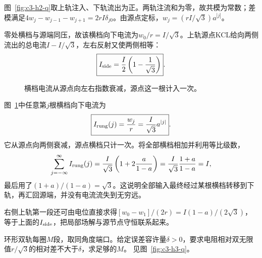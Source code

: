 \begin{solution}
图~\ref{fig:c3-h2-q}取上轨注入、下轨流出为正。两轨注流和为零，故共模为常数；差模满足$4w_j-w_{j-1}-w_{j+1}=2rI\delta_{j0}$。由源点定标，$w_j=(rI/\sqrt3)a^{|j|}$。

零处横档与源端同压，故该横档向下电流为$w_0/r=I/\sqrt3$。上轨源点KCL给向两侧流出的总电流$I-I/\sqrt3$，左右反射又使两侧相等：
\[
 \boxed{I_{\rm side}=\frac I2\left(1-\frac1{\sqrt3}\right)}.
\]
\begin{figure}[H]\centering
{}
\caption{横档电流从源点向左右指数衰减，源点这一根计入一次。}\label{fig:c3-h2-s}
\end{figure}
图~\ref{fig:c3-h2-s}中任意第$j$根横档向下电流为
\[
 \boxed{I_{\rm rung}(j)=\frac{w_j}r=\frac I{\sqrt3}a^{|j|}}.
\]
它从源点向两侧衰减，源点横档只计一次。将全部横档相加并利用等比级数，
\[
 \sum_{j=-\infty}^{\infty}I_{\rm rung}(j)
 =\frac I{\sqrt3}\left(1+2\frac a{1-a}\right)
 =\frac I{\sqrt3}\frac{1+a}{1-a}=I,
\]
最后用了$(1+a)/(1-a)=\sqrt3$。这说明全部输入最终经过某根横档转移到下轨，再汇回源端，并没有电流流失到无穷远。

右侧上轨第一段还可由电位直接求得$[w_0-w_1]/(2r)=I(1-a)/(2\sqrt3)$，等于上面的$I_{\rm side}$，把局部场解与源节点守恒联系起来。
\end{solution}

\begin{exercise}[把环形网络逐渐展开]\label{ex:c3-h3}
环形双轨每圈$M$段，取同角度端口。给定误差容许量$\delta>0$，要求电阻相对双无限值$r/\sqrt3$的相对差不大于$\delta$，求足够的$M$。 见图~\ref{fig:c3-h3-q}。
\end{exercise}

